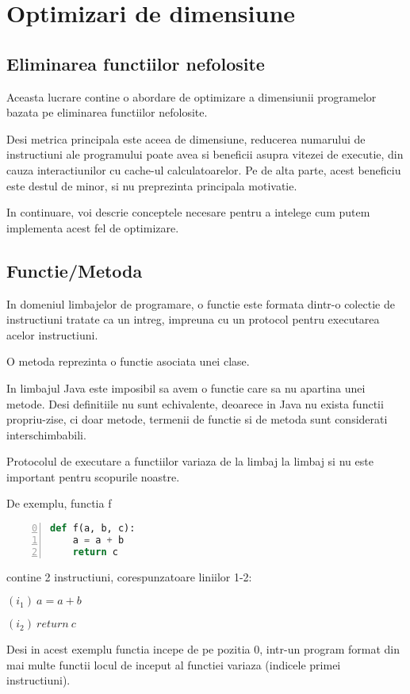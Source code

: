 \chapter{Optimizari de dimensiune}

\section{Eliminarea functiilor nefolosite}

Aceasta lucrare contine o abordare de optimizare a dimensiunii
programelor bazata pe eliminarea functiilor nefolosite.

Desi metrica principala este aceea de dimensiune, reducerea
numarului de instructiuni ale programului poate avea si beneficii
asupra vitezei de executie, din cauza interactiunilor cu cache-ul
calculatoarelor. Pe de alta parte, acest beneficiu este destul de
minor, si nu preprezinta principala motivatie.

In continuare, voi descrie conceptele necesare pentru a intelege
cum putem implementa acest fel de optimizare.

\section{Functie/Metoda}

In domeniul limbajelor de programare, o functie  este
formata dintr-o colectie de instructiuni tratate ca un intreg,
impreuna cu un protocol pentru executarea acelor instructiuni.

O metoda  reprezinta o functie asociata unei clase.

In limbajul Java este imposibil sa avem o functie care sa nu
apartina unei metode.
Desi definitiile nu sunt echivalente, deoarece in Java nu exista
functii propriu-zise, ci doar metode, termenii de functie si de metoda
sunt considerati interschimbabili.

Protocolul de executare a functiilor variaza de la limbaj la
limbaj si nu este important pentru scopurile noastre.

De exemplu, functia f
\begin{lstlisting}[language=Python, numbers=left, firstnumber=0]
def f(a, b, c):
    a = a + b
    return c
\end{lstlisting}
contine 2 instructiuni, corespunzatoare liniilor 1-2:

$(i_1)\ a = a + b$

$(i_2)\ return\ c$

Desi in acest exemplu functia  incepe de pe pozitia 0,
intr-un program format din mai multe functii locul de inceput al
functiei variaza (indicele primei instructiuni).

